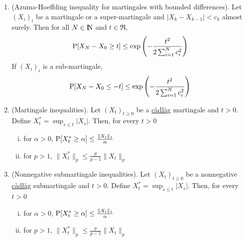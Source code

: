 \documentclass[a4paper,10pt]{scrbook}
\begin{document}
\begin{enumerate}
 \item (Azuma-Hoeffding inequality for martingales with bounded differences). Let $(X_i)_i$
       be a martingale or a  super-martingale and $|X_k-X_{k-1}|<c_{k}$ almost surely. Then for all $N\in\N$
       and $t\in\Re$,
       \[
        \mathrm{P}[X_N-X_0\geq t] \leq \exp \left(-\frac{t^2}{2\sum_{i=1}^{N}c_i^2}\right)
       \]
       If $(X_i)_i$ is a sub-martingale, 
       \[
        \mathrm{P}[X_N-X_0\leq -t] \leq \exp \left(-\frac{t^2}{2\sum_{i=1}^{N}c_i^2}\right)
       \]
 \item (Martingale inequalities). Let \((X_t)_{t\geq 0}\) be a \hyperlink{link:cadlag}{c\`adl\`ag} 
       martingale and \(t > 0\). Define \(X_t^* = \sup_{s \leq t} |X_s|\). Then, for every \(t > 0\)
       \begin{enumerate}[i.]
        \item for \(\alpha > 0\), \(\mathrm{P}[ X_t^* \geq \alpha] \leq \frac{\|X_t\|_1}{\alpha}\) 
        \item for \(p > 1\), \(\|X_t^*\|_p  \leq \frac{p}{p-1} \|X_t\|_p\) 
       \end{enumerate}
 \item (Nonnegative submartingale inequalities). Let \((X_t)_{t\geq 0}\) be a nonnegative 
       \hyperlink{link:cadlag}{c\`adl\`ag} 
       submartingale and \(t > 0\). Define \(X_t^* = \sup_{s \leq t} |X_s|\). 
       Then, for every \(t > 0\)
       \begin{enumerate}[i.]
        \item for \(\alpha > 0\), \(\mathrm{P}[ X_t^* \geq \alpha] \leq \frac{\|X_t\|_1}{\alpha}\) 
        \item for \(p > 1\), \(\|X_t^*\|_p  \leq \frac{p}{p-1} \|X_t\|_p\) 
       \end{enumerate}
       
\end{enumerate}
\end{document}
